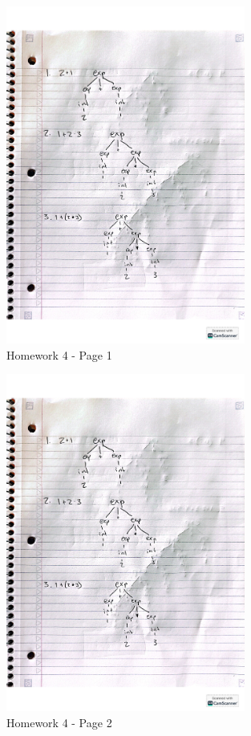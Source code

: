 \documentclass{article}
\theoremstyle{plain}
\theoremstyle{definition}
\theoremstyle{remark}
\begin{document}
\begin{figure}[H]
  \centering
  \includegraphics[width=0.7\textwidth, page=1]{CPSC_354_Homework_4.pdf}
  \caption{Homework 4 - Page 1}
  \label{fig:homework4_page1}
\end{figure}

\begin{figure}[H]
  \centering
  \includegraphics[width=0.7\textwidth, page=2]{CPSC_354_Homework_4.pdf}
  \caption{Homework 4 - Page 2}
  \label{fig:homework4_page2}
\end{figure}
\end{document}
